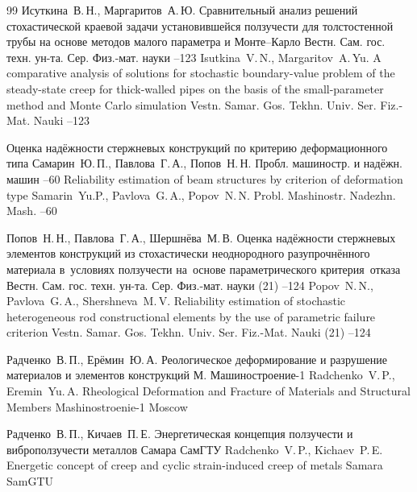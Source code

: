 \begin{thebibliography}{99}
\by Исуткина~В.\,Н., Маргаритов~А.\,Ю.
\paper Сравнительный анализ решений стохастической краевой задачи установившейся ползучести для толстостенной трубы на основе методов малого параметра и Монте--Карло
\jour  Вестн. Сам. гос. техн. ун-та. Сер. Физ.-мат. науки
--123
\misctransl
\by Isutkina~V.\,N., Margaritov~A.\,Yu.
\paper A comparative analysis of solutions for stochastic boundary-value problem of the steady-state creep for thick-walled pipes on the basis of the small-parameter method and Monte Carlo simulation
\jour Vestn. Samar. Gos. Tekhn. Univ. Ser. Fiz.-Mat. Nauki
--123

\paper Оценка надёжности стержневых конструкций по критерию деформационного типа
\by Самарин~Ю.\,П., Павлова~Г.\,А., Попов~Н.\,Н.
\jour Пробл. машиностр. и надёжн. машин
--60
\misctransl
\paper Reliability estimation  of   beam structures by  criterion of deformation  type
\by Samarin~Yu.P., Pavlova~G.\,A., Popov~N.\,N.
\jour Probl. Mashinostr. Nadezhn. Mash. 
--60

\by Попов~Н.\,Н., Павлова~Г.\,А., Шершнёва~М.\,В.
\paper Оценка надёжности стержневых элементов конструкций из стохастически неоднородного разупрочнённого материала в~условиях ползучести на~основе параметрического критерия~отказа
\jour Вестн. Сам. гос. техн. ун-та. Сер. Физ.-мат. науки
(21)
--124
\misctransl
\by Popov~N.\,N., Pavlova~G.\,A., Shershneva~M.\,V.
\paper Reliability estimation of stochastic heterogeneous rod constructional elements by the use of parametric failure criterion
\jour Vestn. Samar. Gos. Tekhn. Univ. Ser. Fiz.-Mat. Nauki
(21)
--124

\by Радченко~В.\,П., Ерёмин~Ю.\,А.
\book Реологическое деформирование и разрушение материалов и элементов конструкций
\publaddr М.
\publ Машиностроение-1
\misctransl
\by Radchenko~V.\,P.,  Eremin~Yu.\,A.
\book Rheological Deformation and Fracture of Materials and Structural Members
\publ Mashinostroenie-1
\publaddr Moscow 

\by Радченко~В.\,П., Кичаев~П.\,Е.
\book Энергетическая концепция ползучести и виброползучести металлов
\publaddr Самара
\publ СамГТУ
\misctransl
\by Radchenko~V.\,P., Kichaev~P.\,E.
\book Energetic concept of creep and cyclic strain-induced creep of metals
\publaddr Samara
\publ SamGTU


\end{thebibliography}
